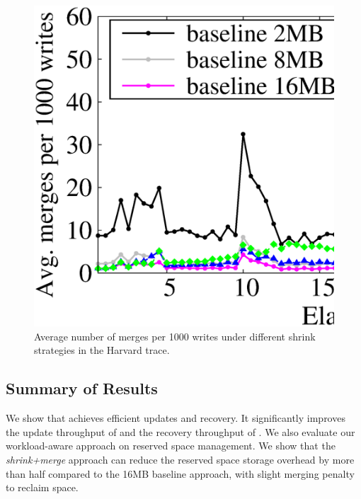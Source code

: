 \begin{figure}[t!]
    \centering
    \includegraphics[width=\linewidth]{charts/harvard_merge/harvard_merge.eps}
    \vspace{-2em}
    \caption{Average number of merges per 1000 writes under different shrink
        strategies in the Harvard trace.}
    \label{fig:harvard_merge}
\end{figure}

%

\subsection{Summary of Results}

We show that \PLR achieves efficient updates and recovery.  It significantly
improves the update throughput of \FO and the recovery throughput of \FL. 
We also evaluate our workload-aware approach on reserved space management. 
We show that the \textit{shrink+merge} approach can reduce the reserved space
storage overhead by more than half compared to the 16MB baseline approach, with
slight merging penalty to reclaim space.  
